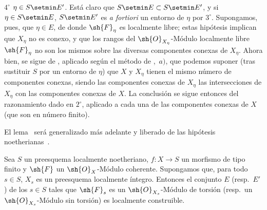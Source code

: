 $4^\circ$ $\eta\in S\setmin E'$.
Está claro que $S\setmin E\subset S\setmin E'$, y si $\eta\in S\setmin E$, $S\setmin E'$ es \emph{a fortiori} un entorno de $\eta$ por $3^\circ$.
Supongamos, pues, que $\eta\in E$, de donde $\sh{F}_\eta$ es localmente libre; estas hipótesis implican que $X_\eta$ no es conexo, y que los rangos del $\sh{O}_{X_\eta}$-Módulo localmente libre $\sh{F}_\eta$ no son los mismos sobre las diversas componentes conexas de $X_\eta$.
Ahora bien, se sigue de , aplicado según el método de ,~$a)$, que podemos suponer (tras sustituir $S$ por un entorno de $\eta$) que $X$ y $X_\eta$ tienen el mismo número de componentes conexas, siendo las componentes conexas de $X_\eta$ las intersecciones de $X_\eta$ con las componentes conexas de $X$.
La conclusión se sigue entonces del razonamiento dado en $2^\circ$, aplicado a cada una de las componentes conexas de $X$ (que son en número finito).

\begin{remark}[9.4.7.2]
\label{IV.9.4.7.2}
El lema~ será generalizado más adelante y liberado de las hipótesis noetherianas~.
\end{remark}

\begin{proposition}[9.4.8]
\label{IV.9.4.8}
Sea $S$ un preesquema localmente noetheriano, $f:X\to S$ un morfismo de tipo finito y $\sh{F}$ un $\sh{O}_X$-Módulo coherente.
Supongamos que, para todo $s\in S$, $X_s$ es un preesquema localmente íntegro.
Entonces el conjunto $E$ \textnormal{(resp.}\ $E'$\textnormal{)} de los $s\in S$ tales que $\sh{F}_s$ es un $\sh{O}_{X_s}$-Módulo de torsión \textnormal{(resp.}\ un $\sh{O}_{X_s}$-Módulo sin torsión\textnormal{)} es localmente construible.
\end{proposition}


